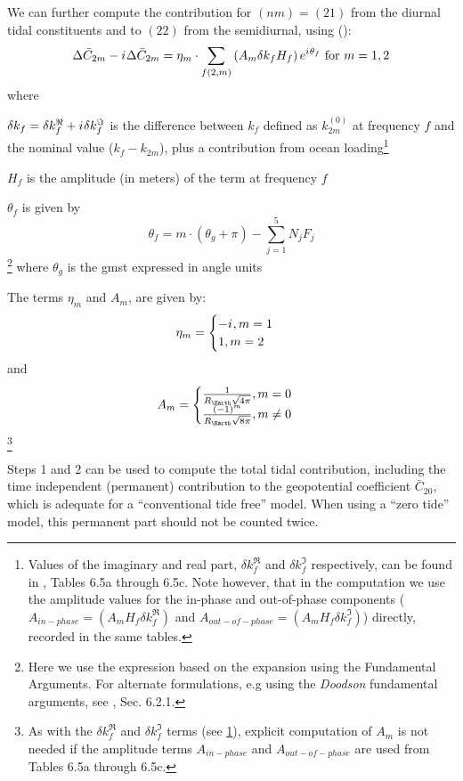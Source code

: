 We can further compute the contribution for $(nm)=(21)$ from the 
diurnal tidal constituents and to $(22)$ from the semidiurnal, using 
(\cite{iers2010}):
\begin{equation}
  \Delta \bar{C}_{2m} - {i\mkern1mu} \Delta \bar{C}_{2m} = 
    \eta _m \cdot \sum _{f(2,m)} \left( A_m \delta k_f H_f\right) e^{{i\mkern1mu} \theta _f} 
    \text{ for } m=1,2
  \label{eq:iers1068b}
\end{equation}
where 
\begin{description}
  \item $\delta k_f = \delta k^\Re _f + {i\mkern1mu} \delta k^\Im _f$ is the difference 
  between $k_f$ defined as $k^{(0)}_{2m}$ at frequency $f$ and the 
  nominal value ($k_f - k_{2m}$), plus a contribution from ocean 
  loading\footnote{\label{fn:set-coefs}Values of the imaginary and real part, $\delta k^\Re _f$ and 
  $\delta k^\Im _f$ respectively, can be found in \cite{iers2010}, Tables 6.5a 
  through 6.5c. Note however, that in the computation we use the amplitude values 
  for the in-phase and out-of-phase components ($A_{in-phase} = \left(A_m H_f \delta k^\Re _f \right)$ 
  and $A_{out-of-phase} = \left( A_m H_f \delta k^\Im _f \right)$) directly, recorded 
  in the same tables.}
  \item $H_f$ is the amplitude (in meters) of the term at frequency $f$
  \item $\theta _f$ is given by 
  \begin{equation} \theta _f = m \cdot ( \theta _g + \pi ) - \sum ^5_{j=1} N_j F_j \end{equation}
  \footnote{Here we use the expression based on the expansion using the Fundamental 
  Arguments. For alternate formulations, e.g using the \emph{Doodson} fundamental 
  arguments, see \cite{iers2010}, Sec. 6.2.1.}
  where $\theta _g$ is the \gls{gmst} expressed in angle units

  \item The terms $\eta _m$ and $A_m$, are given by: 
  \begin{equation}
  \eta _m = 
    \begin{cases} -{i\mkern1mu} , m=1 \\ 1 , m=2\end{cases}
  \end{equation} and
  \begin{equation} 
    A_m = \begin{cases} 
        \frac{1}{R_{\Earth}\sqrt{4 \pi}}, m=0\\
        \frac{(-1)^m}{R_{\Earth}\sqrt{8 \pi}}, m \ne 0
    \end{cases}
  \end{equation}\footnote{As with the $\delta k^\Re _f$ and $\delta k^\Im _f$ terms 
  (see \ref{fn:set-coefs}), explicit computation of $A_m$ is not needed if the 
  amplitude terms $A_{in-phase}$ and $A_{out-of-phase}$ are used from 
  \cite{iers2010} Tables 6.5a through 6.5c.}
\end{description}

Steps 1 and 2 can be used to compute the total tidal contribution, including 
the time independent (permanent) contribution to the geopotential coefficient 
$\bar{C}_{20}$, which is adequate for a ``conventional tide free'' model. 
When using a ``zero tide'' model, this permanent part should not be counted 
twice.
